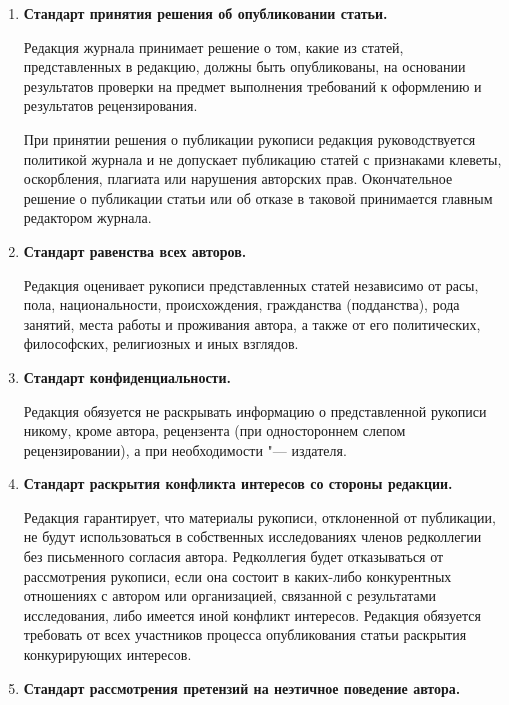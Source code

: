 \begin{enumerate}

\item[\bf 3.1.] {\bf  Стандарт принятия решения об опубликовании статьи.}

Редакция журнала принимает решение о том, какие из статей, представленных в редакцию, должны быть опубликованы, на основании результатов проверки на предмет выполнения требований к оформлению и результатов рецензирования.

При принятии решения о публикации рукописи редакция руководствуется политикой журнала и не допускает публикацию статей с признаками клеветы, оскорбления, плагиата или нарушения авторских прав. Окончательное решение о публикации статьи или об отказе в таковой принимается главным редактором журнала.



\item[\bf 3.2.] {\bf  Стандарт равенства всех авторов.}

Редакция оценивает рукописи представленных статей независимо от расы, пола, национальности, происхождения, гражданства (подданства), рода занятий, места работы и проживания автора, а также от его политических, философских, религиозных и иных взглядов.

\item[\bf 3.3.] {\bf   Стандарт конфиденциальности.}

Редакция обязуется не раскрывать информацию о представленной рукописи никому, кроме автора, рецензента (при одностороннем слепом рецензировании), а при необходимости "--- издателя.



\item[\bf 3.4.] {\bf  Стандарт раскрытия конфликта интересов со стороны редакции.}\linebreak

Редакция гарантирует, что материалы рукописи, отклоненной от публикации, не будут использоваться в собственных исследованиях членов редколлегии без письменного согласия автора. Редколлегия будет отказываться от рассмотрения рукописи, если она состоит в каких-либо конкурентных отношениях с автором или организацией, связанной с результатами исследования, либо имеется иной конфликт интересов. Редакция обязуется требовать от всех участников процесса опубликования статьи раскрытия конкурирующих интересов.



\item[\bf 3.5.] {\bf  Стандарт рассмотрения претензий на неэтичное поведение автора.}


\end{enumerate}
